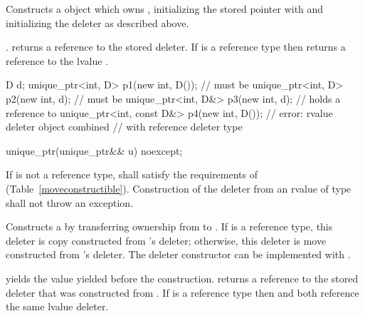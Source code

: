 \begin{itemdescr}
\pnum
\effects Constructs a  object which owns , initializing
the stored pointer with  and initializing the deleter as described above.

\pnum
\postconditions {}.
 returns a reference to the stored
deleter. If  is a reference type then 
returns a reference to the lvalue .

\enterexample

\begin{codeblock}
D d;
unique_ptr<int, D> p1(new int, D());        //  must be 
unique_ptr<int, D> p2(new int, d);          //  must be 
unique_ptr<int, D&> p3(new int, d);         //  holds a reference to 
unique_ptr<int, const D&> p4(new int, D()); // error: rvalue deleter object combined
                                            // with reference deleter type
\end{codeblock}

\exitexample

\end{itemdescr}

%
\begin{itemdecl}
unique_ptr(unique_ptr&& u) noexcept;
\end{itemdecl}

\begin{itemdescr}
\pnum
\requires If  is not a reference type,
 shall satisfy the requirements of 
(Table~\ref{moveconstructible}).
Construction
of the deleter from an rvalue of type  shall not
throw an exception.

\pnum
\effects Constructs a  by transferring ownership from
 to . If  is a reference type, this
deleter is copy constructed from 's deleter; otherwise, this
deleter is move constructed from 's deleter. \enternote The
deleter constructor can be implemented with . \exitnote

\pnum
\postconditions {} yields the value 
yielded before the construction.  returns a reference
to the stored deleter that was constructed from
. If  is a reference type then
 and  both reference
the same lvalue deleter.
\end{itemdescr}

